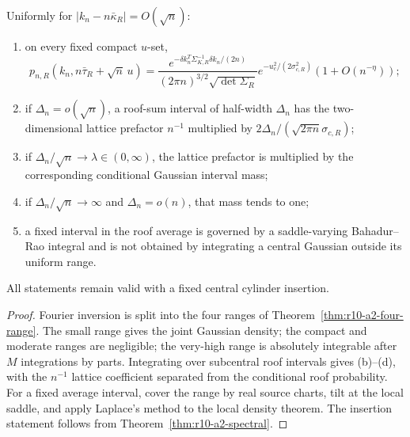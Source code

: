 \begin{theorem}
\label{thm:r10-a2-llt}
Uniformly for \(|k_n-n\bar\kappa_R|=O(\sqrt n)\):
\begin{enumerate}[label=(\alph*)]
\item on every fixed compact \(u\)-set,
\[
 p_{n,R}(k_n,n\bar\tau_R+\sqrt n\,u)
 =\frac{e^{-\delta k_n^T\Sigma_{K,R}^{-1}\delta k_n/(2n)}}
 {(2\pi n)^{3/2}\sqrt{\det\Sigma_R}}
 e^{-u_c^2/(2\sigma_{c,R}^2)}(1+O(n^{-\eta}));
\]
\item if \(\Delta_n=o(\sqrt n)\), a roof-sum interval of half-width
      \(\Delta_n\) has the two-dimensional lattice prefactor \(n^{-1}\)
      multiplied by \(2\Delta_n/(\sqrt{2\pi n}\sigma_{c,R})\);
\item if \(\Delta_n/\sqrt n\to\lambda\in(0,\infty)\), the lattice prefactor
      is multiplied by the corresponding conditional Gaussian interval mass;
\item if \(\Delta_n/\sqrt n\to\infty\) and \(\Delta_n=o(n)\), that mass tends
      to one;
\item a fixed interval in the roof average is governed by a saddle-varying
      Bahadur--Rao integral and is not obtained by integrating a central
      Gaussian outside its uniform range.
\end{enumerate}
All statements remain valid with a fixed central cylinder insertion.
\end{theorem}

\begin{proof}
Fourier inversion is split into the four ranges of
Theorem~\ref{thm:r10-a2-four-range}.  The small range gives the joint Gaussian
density; the compact and moderate ranges are negligible; the very-high range
is absolutely integrable after \(M\) integrations by parts.  Integrating over
subcentral roof intervals gives (b)--(d), with the \(n^{-1}\) lattice
coefficient separated from the conditional roof probability.  For a fixed
average interval, cover the range by real source charts, tilt at the local
saddle, and apply Laplace's method to the local density theorem.  The insertion
statement follows from Theorem~\ref{thm:r10-a2-spectral}.
\end{proof}
